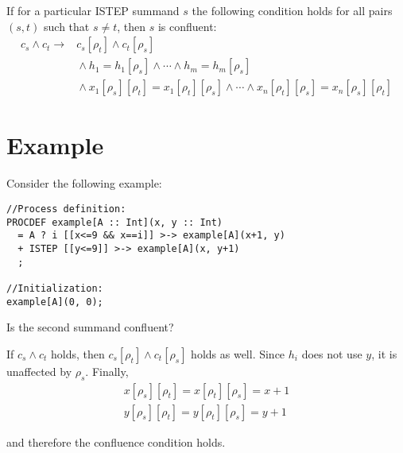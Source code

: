 If for a particular ISTEP summand $s$ the following condition holds for all pairs $(s, t)$ such that $s \neq t$, then $s$ is confluent:
\begin{align*}
c_s \land c_t \rightarrow{} &c_s[\rho_t] \land c_t[\rho_s] \\
&{} \land h_1 = h_1[\rho_s] \land \cdots{} \land h_m = h_m[\rho_s] \\
&{} \land x_1[\rho_s][\rho_t] = x_1[\rho_t][\rho_s] \land \cdots{} \land x_n[\rho_t][\rho_s] = x_n[\rho_s][\rho_t]
\end{align*}

\section{Example}

Consider the following example:

\begin{lstlisting}
//Process definition:
PROCDEF example[A :: Int](x, y :: Int)
  = A ? i [[x<=9 && x==i]] >-> example[A](x+1, y)
  + ISTEP [[y<=9]] >-> example[A](x, y+1)
  ;

//Initialization:
example[A](0, 0);
\end{lstlisting}

Is the second summand confluent?

If $c_s \land c_t$ holds, then $c_s[\rho_t] \land c_t[\rho_s]$ holds as well.
Since $h_i$ does not use $y$, it is unaffected by $\rho_s$.
Finally,
\begin{align*}
x[\rho_s][\rho_t] = x[\rho_t][\rho_s] = x+1 \\
y[\rho_s][\rho_t] = y[\rho_t][\rho_s] = y+1
\end{align*}

and therefore the confluence condition holds.

